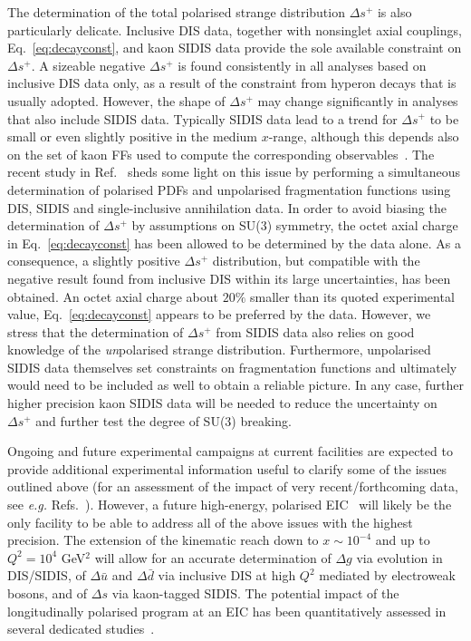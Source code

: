 The determination of the total polarised strange distribution $\Delta s^+$ is 
also particularly delicate.
%
Inclusive DIS data, together with nonsinglet axial couplings, 
Eq.~\eqref{eq:decayconst}, and kaon SIDIS data provide the sole available 
constraint on $\Delta s^+$.
%
A sizeable negative $\Delta s^+$ is found 
consistently in all analyses based on inclusive DIS data only, as a result 
of the constraint from hyperon decays that is usually adopted. 
%
However, the shape of $\Delta s^+$ may change significantly in analyses that also include
SIDIS data. Typically SIDIS data lead to a trend for $\Delta s^+$ to be
small or even slightly positive in the medium $x$-range, although this depends 
also on the set of kaon FFs used to compute
the corresponding observables~\cite{Leader:2011tm}.  
%
The recent study in Ref.~\cite{Ethier:2017zbq} sheds some light on this issue
by performing a simultaneous determination of polarised PDFs and unpolarised 
fragmentation functions using DIS, SIDIS and single-inclusive annihilation data.
%
In order to avoid biasing the determination of $\Delta s^+$ by 
assumptions on SU(3) symmetry, the octet axial charge in 
Eq.~\eqref{eq:decayconst} has been allowed to be determined by the data alone.
%
As a consequence, a slightly positive $\Delta s^+$ distribution, but
compatible with the negative result found from inclusive DIS within its 
large uncertainties, has been obtained.
% 
An octet axial charge about $20\%$ smaller than its quoted experimental value, 
Eq.~\eqref{eq:decayconst} appears to be preferred by the data.
%
However, we stress that the determination of $\Delta s^+$ from SIDIS data 
also relies on good knowledge of the {\it un}polarised strange distribution. 
%
Furthermore, unpolarised SIDIS data themselves set constraints on 
fragmentation functions and ultimately would need to be included as well
to obtain a reliable picture. 
%
In any case, further higher precision kaon SIDIS data will be needed 
to reduce the uncertainty on $\Delta s^+$ and further test the degree of 
SU(3) breaking. 

Ongoing and future experimental campaigns at current facilities are
expected to provide additional experimental information
useful to clarify some of the issues outlined above (for an 
assessment of the impact of very recent/forthcoming data, see {\it e.g.}
Refs.~\cite{Aschenauer:2015eha,Aschenauer:2015ata,Nocera:2015vva,
Nocera:2017wep}).
%
However, a future high-energy, polarised EIC~\cite{Accardi:2012qut} will 
likely be the only facility to be able to address all of the above issues 
with the highest precision. 
% 
The extension of the kinematic reach down to $x\sim 10^{-4}$ and up to
$Q^2=10^4$ GeV$^2$ will allow for an accurate determination of $\Delta g$
via evolution in DIS/SIDIS, of $\Delta\bar{u}$ and 
$\Delta\bar{d}$ via inclusive DIS at high $Q^2$ mediated by electroweak bosons,
and of $\Delta s$ via kaon-tagged SIDIS. 
%
The potential impact of the longitudinally polarised program at an EIC
has been quantitatively assessed in several dedicated 
studies~\cite{Aschenauer:2012ve,Ball:2013tyh,Aschenauer:2013iia,
Aschenauer:2015ata}.

